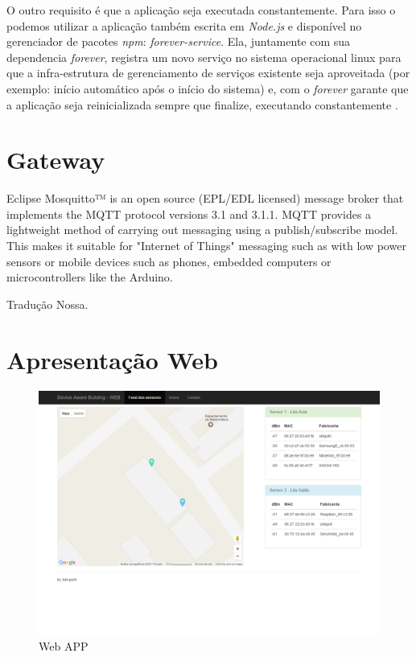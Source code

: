 O outro requisito é que a aplicação seja executada constantemente. Para isso o
podemos utilizar a aplicação também escrita em \emph{Node.js} e disponível no
gerenciador de pacotes \emph{npm}: \emph{forever-service}. Ela, juntamente com
sua dependencia \emph{forever}, registra um novo serviço no sistema operacional
linux para que a infra-estrutura de gerenciamento de serviços  existente seja
aproveitada (por exemplo: início automático após o início do sistema) e, com o
\emph{forever} garante que a aplicação seja reinicializada sempre que finalize,
executando constantemente \cite{forever-service}.


\section{Gateway}
\label{sec:app-gw}

\begin{citacao}

	Eclipse Mosquitto™ is an open source (EPL/EDL licensed) message broker that
	implements the MQTT protocol versions 3.1 and 3.1.1. MQTT provides a lightweight
	method of carrying out messaging using a publish/subscribe model. This makes it
	suitable for "Internet of Things" messaging such as with low power sensors or
	mobile devices such as phones, embedded computers or microcontrollers like the
	Arduino. \

	 Tradução Nossa.
\end{citacao}


\section{Apresentação Web}
\label{sec:app-web}


\begin{figure}[htb]
	\caption{\label{fig-web-app}Web APP}
	\begin{center}
		\includegraphics[width=1\textwidth]{050-construcao/web-app.png}
	\end{center}
\end{figure}
